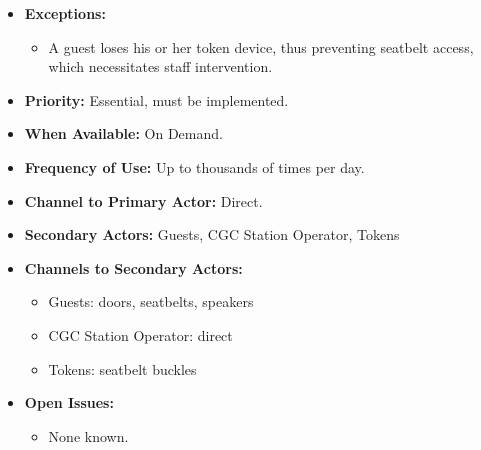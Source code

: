 \documentclass[12pt]{article}
\begin{document}
\begin{itemize}
        \item[]\textbf{Exceptions:}
            \begin{itemize}
                \item[] A guest loses his or her token device, thus preventing seatbelt access, which necessitates
                staff intervention.
            \end{itemize}

        \item[]\textbf{Priority:}
            Essential, must be implemented.

        \item[]\textbf{When Available:}
            On Demand.

        \item[]\textbf{Frequency of Use:}
            Up to thousands of times per day.
            
        \item[]\textbf{Channel to Primary Actor:}
            Direct.

        \item[]\textbf{Secondary Actors:}
            Guests, CGC Station Operator, Tokens
            
        \item[]\textbf{Channels to Secondary Actors:}
            \begin{itemize}
                \item[] Guests: doors, seatbelts, speakers
                \item[] CGC Station Operator: direct
                \item[] Tokens: seatbelt buckles
            \end{itemize}

        \item[]\textbf{Open Issues:}
            \begin{itemize}
                \item[] None known.
            \end{itemize}
    \end{itemize}
\end{document}
